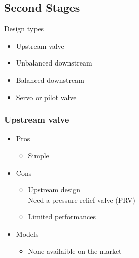 \documentclass[aspectratio=1610,english,12pt]{beamer}
\begin{document}
\subsection{Second Stages}

\begin{frame}{Design types}
	\begin{itemize}
		\item Upstream valve
		\item Unbalanced downstream
		\item Balanced downstream
		\item Servo or pilot valve
	\end{itemize}
\end{frame}

\subsubsection{Upstream valve}
\begin{frame}{\insertsubsubsection}
\end{frame}

\begin{frame}{\insertsubsubsection}
	\begin{itemize}
		\item Pros
		\begin{itemize}
			\item Simple
		\end{itemize}
		\item Cons
		\begin{itemize}
			\item Upstream design\\ Need a pressure relief valve (PRV)
			\item Limited performances
		\end{itemize}
	\end{itemize}
\end{frame}

\begin{frame}{\insertsubsubsection}
	\begin{itemize}
		\item Models
		\begin{itemize}
			\item None availaible on the market
		\end{itemize}
	\end{itemize}
\end{frame}
\end{document}

